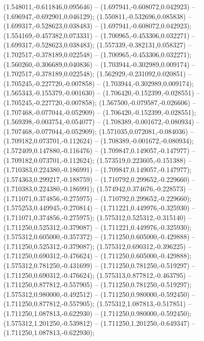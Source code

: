  (1.548011,-0.611846,0.095646) -- (1.697941,-0.608072,0.042923) -- (1.696947,-0.692901,0.046129);
 (1.550811,-0.532696,0.085838) -- (1.699317,-0.528623,0.038483) -- (1.697941,-0.608072,0.042923);
 (1.554169,-0.457382,0.073331) -- (1.700965,-0.453306,0.032271) -- (1.699317,-0.528623,0.038483);
 (1.557339,-0.382131,0.058327) -- (1.702517,-0.378189,0.022548) -- (1.700965,-0.453306,0.032271);
 (1.560260,-0.306689,0.040836) -- (1.703944,-0.302989,0.009174) -- (1.702517,-0.378189,0.022548);
 (1.562929,-0.231092,0.020851) -- (1.705245,-0.227720,-0.007858) -- (1.703944,-0.302989,0.009174);
 (1.565343,-0.155379,-0.001630) -- (1.706420,-0.152399,-0.028551) -- (1.705245,-0.227720,-0.007858);
 (1.567500,-0.079587,-0.026606) -- (1.707468,-0.077044,-0.052909) -- (1.706420,-0.152399,-0.028551);
 (1.569398,-0.003754,-0.054077) -- (1.708389,-0.001672,-0.080934) -- (1.707468,-0.077044,-0.052909);
 (1.571035,0.072081,-0.084036) -- (1.709182,0.073701,-0.112624) -- (1.708389,-0.001672,-0.080934);
 (1.572409,0.147880,-0.116476) -- (1.709847,0.149057,-0.147977) -- (1.709182,0.073701,-0.112624);
 (1.573519,0.223605,-0.151388) -- (1.710383,0.224380,-0.186991) -- (1.709847,0.149057,-0.147977);
 (1.574363,0.299217,-0.188759) -- (1.710792,0.299652,-0.229660) -- (1.710383,0.224380,-0.186991);
 (1.574942,0.374676,-0.228573) -- (1.711071,0.374856,-0.275975) -- (1.710792,0.299652,-0.229660);
 (1.575253,0.449945,-0.270814) -- (1.711221,0.449976,-0.325930) -- (1.711071,0.374856,-0.275975);
 (1.575312,0.525312,-0.315140) -- (1.711250,0.525312,-0.379087) -- (1.711221,0.449976,-0.325930);
 (1.575312,0.605000,-0.357372) -- (1.711250,0.605000,-0.429888) -- (1.711250,0.525312,-0.379087);
 (1.575312,0.690312,-0.396225) -- (1.711250,0.690312,-0.476624) -- (1.711250,0.605000,-0.429888);
 (1.575312,0.781250,-0.431699) -- (1.711250,0.781250,-0.519297) -- (1.711250,0.690312,-0.476624);
 (1.575313,0.877812,-0.463795) -- (1.711250,0.877812,-0.557905) -- (1.711250,0.781250,-0.519297);
 (1.575312,0.980000,-0.492512) -- (1.711250,0.980000,-0.592450) -- (1.711250,0.877812,-0.557905);
 (1.575312,1.087813,-0.517851) -- (1.711250,1.087813,-0.622930) -- (1.711250,0.980000,-0.592450);
 (1.575312,1.201250,-0.539812) -- (1.711250,1.201250,-0.649347) -- (1.711250,1.087813,-0.622930);
